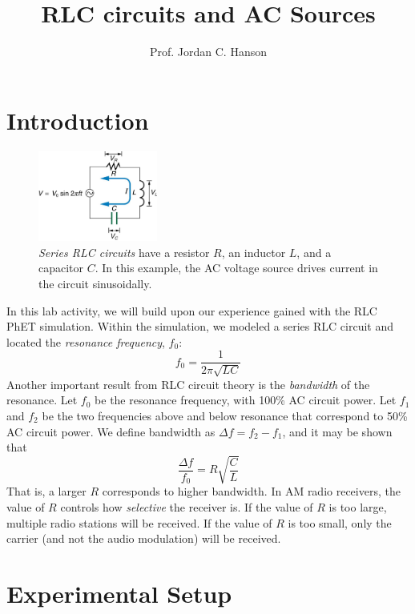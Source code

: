 \documentclass[12pt,twocolumn]{article}
\title{RLC circuits and AC Sources}
\author{Prof. Jordan C. Hanson}
\begin{document}
\small
\maketitle

\section{Introduction}

\begin{figure}[ht]
\centering
\includegraphics[width=0.35\textwidth]{RLC_1.jpeg}
\caption{\label{fig:rlc_1} \textit{Series RLC circuits} have a resistor $R$, an inductor $L$, and a capacitor $C$.  In this example, the AC voltage source drives current in the circuit sinusoidally.}
\end{figure}

\noindent
In this lab activity, we will build upon our experience gained with the RLC PhET simulation.  Within the simulation, we modeled a series RLC circuit and located the \textit{resonance frequency}, $f_0$:
\begin{equation}
f_0 = \frac{1}{2\pi\sqrt{LC}}
\end{equation}
Another important result from RLC circuit theory is the \textit{bandwidth} of the resonance.  Let $f_0$ be the resonance frequency, with 100\% AC circuit power.  Let $f_1$ and $f_2$ be the two frequencies above and below resonance that correspond to 50\% AC circuit power.  We define bandwidth as $\Delta f = f_2 - f_1$, and it may be shown that
\begin{equation}
\frac{\Delta f}{f_0} = R\sqrt{\frac{C}{L}}
\end{equation}
That is, a larger $R$ corresponds to higher bandwidth.  In AM radio receivers, the value of $R$ controls how \textit{selective} the receiver is.  If the value of $R$ is too large, multiple radio stations will be received.  If the value of $R$ is too small, only the carrier (and not the audio modulation) will be received.

\section{Experimental Setup}
\end{document}
